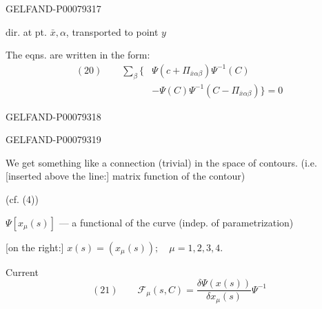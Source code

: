 \begin{GelfandAdjacentEvidence}{GELFAND-P000793}{17}


dir. at pt. \(\bar{x},\alpha\), transported to point \(y\)

The eqns. are written in the form:
\[
\begin{aligned}
(20)\qquad \sum_\beta\bigl\{&
\Psi(c+\Pi_{\bar{x}\alpha\beta})\Psi^{-1}(C)\\
&-\Psi(C)\Psi^{-1}(C-\Pi_{\bar{x}\alpha\beta})\bigr\}=0
\end{aligned}
\]
\end{GelfandAdjacentEvidence}
\begin{GelfandAdjacentEvidence}{GELFAND-P000793}{18}

\end{GelfandAdjacentEvidence}
\begin{GelfandAdjacentEvidence}{GELFAND-P000793}{19}


We get something like a connection (trivial) in the space of contours.
(i.e. [inserted above the line:] matrix function of the contour)

(cf. (4))


\(\Psi[x_{\mu}(s)]\) --- a functional of the curve
(indep. of parametrization)

[on the right:] \(x(s)=(x_\mu(s));\quad \mu=1,2,3,4.\)
\end{GelfandAdjacentEvidence}


Current
\[
(21)\qquad \mathcal{F}_\mu(s,C)=\frac{\delta\Psi(x(s))}{\delta x_\mu(s)}\Psi^{-1}
\]


